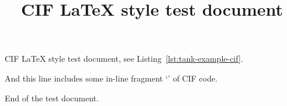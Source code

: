 \documentclass{article}
\title{CIF \LaTeX{} style test document}
\begin{document}
\maketitle

CIF \LaTeX{} style test document, see Listing~\ref{lst:tank-example-cif}.

\noindent
\medskip
{}

And this line includes some in-line fragment `'
of CIF code.

End of the test document.
\end{document}
